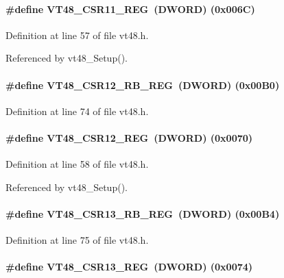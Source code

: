 \paragraph[{VT48\_\-CSR11\_\-REG}]{\setlength{\rightskip}{0pt plus 5cm}\#define VT48\_\-CSR11\_\-REG~({\bf DWORD}) (0x006C)}\hfill\label{vt48_8h_a7d5aeebbbb73fc59a63dff0eef2c956b}


Definition at line 57 of file vt48.h.

Referenced by vt48\_\-Setup().
\paragraph[{VT48\_\-CSR12\_\-RB\_\-REG}]{\setlength{\rightskip}{0pt plus 5cm}\#define VT48\_\-CSR12\_\-RB\_\-REG~({\bf DWORD}) (0x00B0)}\hfill\label{vt48_8h_a1f75c32906ff4385d16e2bd2288d02b4}


Definition at line 74 of file vt48.h.
\paragraph[{VT48\_\-CSR12\_\-REG}]{\setlength{\rightskip}{0pt plus 5cm}\#define VT48\_\-CSR12\_\-REG~({\bf DWORD}) (0x0070)}\hfill\label{vt48_8h_a82c8be1ff079ad31992240d8c0b54deb}


Definition at line 58 of file vt48.h.

Referenced by vt48\_\-Setup().
\paragraph[{VT48\_\-CSR13\_\-RB\_\-REG}]{\setlength{\rightskip}{0pt plus 5cm}\#define VT48\_\-CSR13\_\-RB\_\-REG~({\bf DWORD}) (0x00B4)}\hfill\label{vt48_8h_a6b05e8d17299e08009741bd997534cfd}


Definition at line 75 of file vt48.h.
\paragraph[{VT48\_\-CSR13\_\-REG}]{\setlength{\rightskip}{0pt plus 5cm}\#define VT48\_\-CSR13\_\-REG~({\bf DWORD}) (0x0074)}\hfill\label{vt48_8h_a37a837f033fc0eb811c789cedc9103ad}


